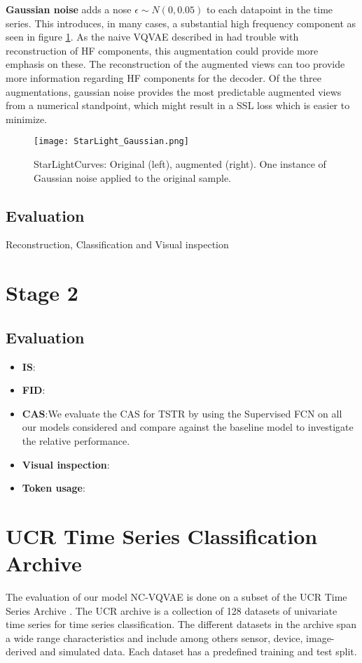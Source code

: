 \documentclass[../../thesis.tex]{subfiles}
\begin{document}
\textbf{Gaussian noise} adds a nose $\epsilon \sim N(0,0.05)$ to each datapoint in the time series. This introduces, in many cases, a substantial high frequency component as seen in figure \ref{fig:StarLight_Gaussian}. As the naive VQVAE described in \cite{TimeVQVAE} had trouble with reconstruction of HF components, this augmentation could provide more emphasis on these. The reconstruction of the augmented views can too provide more information regarding HF components for the decoder. Of the three augmentations, gaussian noise provides the most predictable augmented views from a numerical standpoint, which might result in a SSL loss which is easier to minimize.

\begin{figure}[h]
    \label{fig:StarLight_Gaussian}
    \texttt{[image: StarLight\_Gaussian.png]}
    \centering
    \caption{StarLightCurves: Original (left), augmented (right). One instance of Gaussian noise applied to the original sample.}
\end{figure}

\subsection{Evaluation}
Reconstruction, Classification and Visual inspection



\section{Stage 2}

\subsection{Evaluation}

\begin{itemize}
    \item \textbf{IS}:
    \item \textbf{FID}:
    \item \textbf{CAS}:We evaluate the CAS for TSTR by using the Supervised FCN on all our models considered and compare against the baseline model to investigate the relative performance. 
    \item \textbf{Visual inspection}:
    \item \textbf{Token usage}:
\end{itemize}


\section{UCR Time Series Classification Archive}
The evaluation of our model NC-VQVAE is done on a subset of the UCR Time Series Archive \cite{UCRArchive2018}. The UCR archive is a collection of 128 datasets of univariate time series for time series classification. The different datasets in the archive span a wide range characteristics and include among others sensor, device, image-derived and simulated data. Each dataset has a predefined training and test split.\newline
\end{document}
